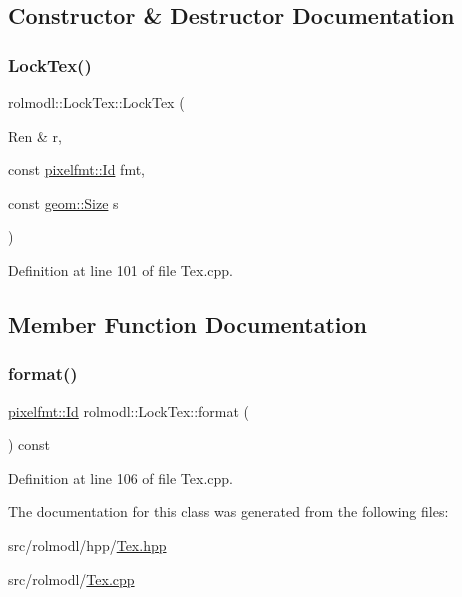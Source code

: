 \subsection{Constructor \& Destructor Documentation}
\mbox{\label{classrolmodl_1_1texture_type_1_1_lock_tex_a70b8dd7d3bc6100a7c55c39dff33f66b}} 
\subsubsection{\texorpdfstring{LockTex()}{LockTex()}}
{\footnotesize\ttfamily rolmodl\+::\+Lock\+Tex\+::\+Lock\+Tex (\begin{DoxyParamCaption}\item[{Ren \&}]{r,  }\item[{const \mbox{\hyperlink{namespacerolmodl_1_1pixelfmt_a96282713e4465ba9211c8fd3a702b52b}{pixelfmt\+::\+Id}}}]{fmt,  }\item[{const \mbox{\hyperlink{structrolmodl_1_1geom_1_1_size}{geom\+::\+Size}}}]{s }\end{DoxyParamCaption})}



Definition at line 101 of file Tex.\+cpp.



\subsection{Member Function Documentation}
\mbox{\label{classrolmodl_1_1texture_type_1_1_lock_tex_a053999d8ef6ffe5b4e5f3b49021286fc}} 
\subsubsection{\texorpdfstring{format()}{format()}}
{\footnotesize\ttfamily \mbox{\hyperlink{namespacerolmodl_1_1pixelfmt_a96282713e4465ba9211c8fd3a702b52b}{pixelfmt\+::\+Id}} rolmodl\+::\+Lock\+Tex\+::format (\begin{DoxyParamCaption}{ }\end{DoxyParamCaption}) const\hspace{0.3cm}{\ttfamily [noexcept]}}



Definition at line 106 of file Tex.\+cpp.



The documentation for this class was generated from the following files\+:\begin{DoxyCompactItemize}
\item 
src/rolmodl/hpp/\mbox{\hyperlink{_tex_8hpp}{Tex.\+hpp}}\item 
src/rolmodl/\mbox{\hyperlink{_tex_8cpp}{Tex.\+cpp}}\end{DoxyCompactItemize}

